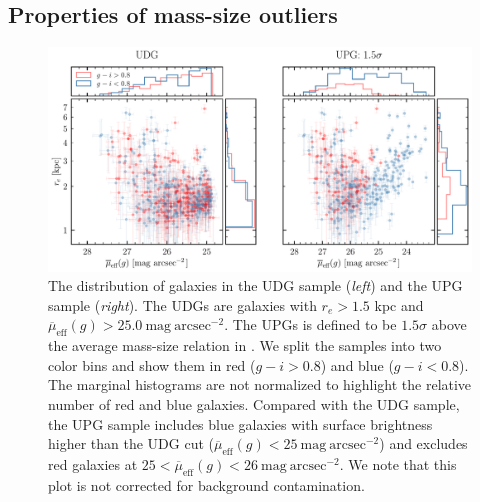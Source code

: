 \documentclass[twocolumn,astrosymb,twocolappendix]{aastex631}
\newcommand{\sbunit}{\mathrm{mag\ arcsec}^{-2}}
\newcommand{\sbeff}{\overline{\mu}_{\mathrm{eff}}(g)}
\begin{document}
\begin{CJK*}{UTF8}{gbsn}
\subsection{Properties of mass-size outliers}\label{sec:mass-size}
\begin{figure}
	\vbox{ 
		\centering
		\includegraphics[width=1\linewidth]{udg_upg_sample.pdf}
	}
    \caption{The distribution of galaxies in the UDG sample (\textit{left}) and the UPG sample (\textit{right}). The UDGs are galaxies with $r_e>1.5$ kpc and $\sbeff > 25.0\ \sbunit$. The UPGs is defined to be $1.5\sigma$ above the average mass-size relation in \citet{ELVES-I}. We split the samples into two color bins and show them in red ($g-i>0.8$) and blue ($g-i<0.8$). The marginal histograms are not normalized to highlight the relative number of red and blue galaxies. Compared with the UDG sample, the UPG sample includes blue galaxies with surface brightness higher than the UDG cut ($\sbeff < 25\ \sbunit$) and excludes red galaxies at $25 < \sbeff < 26\ \sbunit$. We note that this plot is not corrected for background contamination.
    }
    \label{fig:udg_upg_re_mu}
\end{figure}


\end{CJK*}
\end{document}

